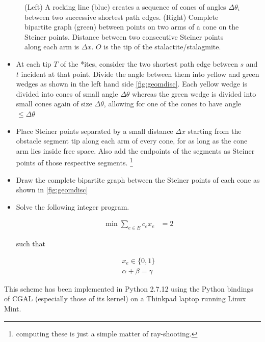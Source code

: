 \begin{figure}[H]
\begin{minipage}[t]{0.3\textwidth}
\end{minipage}
\caption{(Left) A rocking line (blue) creates a sequence of cones of angles 
     $\Delta \theta_i$ between two successive shortest path edges. (Right) Complete bipartite graph (green) between points on two arms of a cone on the Steiner points. 
              Distance between two consecutive Steiner points along each arm is $\Delta x$. $O$ is the tip of the 
      stalactite/stalagmite.}
\label{fig:geomdisc}
\end{figure}






 \begin{itemize}
  \item At each tip $T$ of the *ites, consider the two shortest path edge between $s$ and $t$ incident at that point. Divide the angle between them into 
        yellow and green wedges as shown in the left hand side \autoref{fig:geomdisc}. Each yellow wedge is divided into cones of small angle $\Delta \theta$
        whereas the green wedge is divided into small cones again of size $\Delta \theta$, allowing for one of the cones to have angle $\leq \Delta \theta$

 \item Place Steiner points separated by a small distance $\Delta x$ starting from the obstacle segment tip along each arm of every cone, 
        for as long as the cone arm lies inside free space. Also add the endpoints of the segments as Steiner points of those respective segments. 
       \footnote{computing these is just a simple matter of ray-shooting. }
 \item Draw the complete bipartite graph between the Steiner points of each cone  as shown in \autoref{fig:geomdisc}
 \item Solve the following integer program. 
           

\begin{align}
\min \sum_{e \in E} c_e x_e   &= 2
\end{align}

such that 

\begin{align}
  x_e \in \{0,1\} \\
     \alpha + \beta = \gamma
\end{align}


 \end{itemize}



 This scheme has been implemented in Python 2.7.12 using the Python bindings of CGAL (especially those of its kernel) on a Thinkpad laptop running Linux Mint. 
\nwenddocs{}


